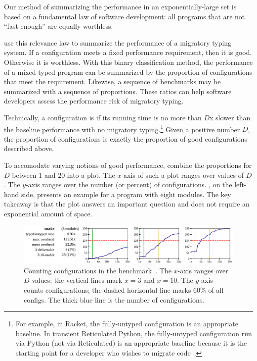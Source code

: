 Our method of summarizing the performance in an exponentially-large set
 is based on a fundamental law of software development:
 all programs that are not ``fast enough'' are equally worthless.

\citet{tfgnvf-popl-2016} use this relevance law to summarize the performance
 of a migratory typing system.
If a configuration meets a fixed performance requirement, then it is good.
Otherwise it is worthless.
With this binary classification method, the performance of a mixed-typed program
 can be summarized by the proportion of configurations that meet the requirement.
Likewise, a sequence of benchmarks may be summarized with a sequence of
 proportions.
These ratios can help software developers assess the performance risk of
 migratory typing.

Technically, a configuration is 
 if its running time is no more than $D$x slower than the baseline performance
 with no migratory typing.\footnote{For example, in Racket, the fully-untyped configuration
 is an appropriate baseline. In transient Reticulated Python, the fully-untyped configuration
 run via Python (not via Reticulated) is an appropriate baseline because it is the starting
 point for a developer who wishes to migrate code~\cite{gm-pepm-2018}.}
Given a positive number $D$, the proportion of  configurations
 is exactly the proportion of good configurations described above.

To accomodate varying notions of good performance, \citet{tfgnvf-popl-2016}
 combine the proportions for $D$ between $1$ and $20$ into a plot.
The $x$-axis of such a plot ranges over values of $D$.
The $y$-axis ranges over the number (or percent) of configurations.
, on the left-hand side, presents an example
 for a program with eight modules.
The key takeaway is that the plot answers an important question and does
 not require an exponential amount of space.

\begin{figure}[h]
\includegraphics[width=0.96\columnwidth]{src/snake-popl.png}
\caption{Counting  configurations in the 
         benchmark~\cite{tfgnvf-popl-2016}. The $x$-axis ranges over $D$ values;
         the vertical lines mark $x=3$ and $x=10$.
         The $y$-axis counts configurations; the dashed horizontal line marks
         $60$\% of all configs.
         The thick blue line is the number of  configurations.}
\label{fig:snake-popl}
\end{figure}


